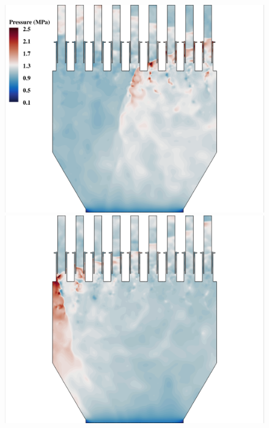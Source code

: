 \begin{figure}
	\begin{minipage}{0.49\linewidth}
		\includegraphics[width=0.99\linewidth,trim={0.5em 0em 6cm 0em},clip]{Chapters/HPROMResults/Images/nineElem/example_snaps/example_pressure_z.png}
	\end{minipage}
	\begin{minipage}{0.49\linewidth}
		\includegraphics[width=0.99\linewidth,trim={6cm 0em 0.5em 0em},clip]{Chapters/HPROMResults/Images/nineElem/example_snaps/example_pressure_z_216000.png}
	\end{minipage}


\end{figure}
